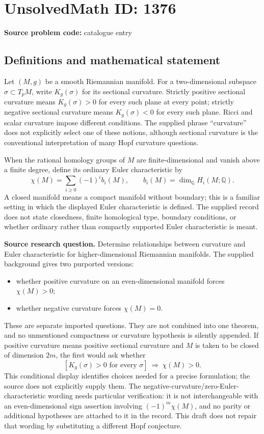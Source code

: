 \documentclass[11pt]{article}
\newcommand{\Q}{\mathbb{Q}}
\begin{document}
\section*{UnsolvedMath ID: 1376}
\textbf{Source problem code:} catalogue entry
\subsection{Definitions and mathematical statement}
Let $(M,g)$ be a smooth Riemannian manifold. For a two-dimensional subspace $\sigma\subset T_pM$, write $K_g(\sigma)$ for its sectional curvature. Strictly positive sectional curvature means $K_g(\sigma)>0$ for every such plane at every point; strictly negative sectional curvature means $K_g(\sigma)<0$ for every such plane. Ricci and scalar curvature impose different conditions. The supplied phrase ``curvature'' does not explicitly select one of these notions, although sectional curvature is the conventional interpretation of many Hopf curvature questions.

When the rational homology groups of $M$ are finite-dimensional and vanish above a finite degree, define its ordinary Euler characteristic by
\[
 \chi(M)=\sum_{i\geq0}(-1)^i b_i(M),\qquad
 b_i(M)=\dim_{\Q}H_i(M;\Q).
\]
A closed manifold means a compact manifold without boundary; this is a familiar setting in which the displayed Euler characteristic is defined. The supplied record does not state closedness, finite homological type, boundary conditions, or whether ordinary rather than compactly supported Euler characteristic is meant.

\textbf{Source research question.} Determine relationships between curvature and Euler characteristic for higher-dimensional Riemannian manifolds. The supplied background gives two purported versions:
\begin{itemize}
\item whether positive curvature on an even-dimensional manifold forces $\chi(M)>0$;
\item whether negative curvature forces $\chi(M)=0$.
\end{itemize}
These are separate imported questions. They are not combined into one theorem, and no unmentioned compactness or curvature hypothesis is silently appended. If positive curvature means positive sectional curvature and $M$ is taken to be closed of dimension $2m$, the first would ask whether
\[
 [K_g(\sigma)>0\text{ for every }\sigma]\ \Longrightarrow\ \chi(M)>0.
\]
This conditional display identifies choices needed for a precise formulation; the source does not explicitly supply them. The negative-curvature/zero-Euler-characteristic wording needs particular verification: it is not interchangeable with an even-dimensional sign assertion involving $(-1)^m\chi(M)$, and no parity or additional hypotheses are attached to it in the record. This draft does not repair that wording by substituting a different Hopf conjecture.
\end{document}
